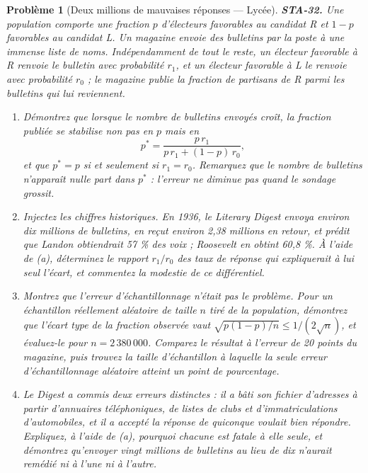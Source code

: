 \documentclass[11pt]{article}
\newtheorem{problem}{Problème}
\begin{document}
\bigskip

\begin{problem}[{Deux millions de mauvaises réponses --- Lycée}]
\textbf{STA-32.} Une population comporte une fraction $ p $ d'électeurs favorables au candidat
R et $ 1 - p $ favorables au candidat L. Un magazine envoie des bulletins par la poste à une
immense liste de noms. Indépendamment de tout le reste, un électeur favorable à R renvoie le
bulletin avec probabilité $ r_1 $, et un électeur favorable à L le renvoie avec probabilité
$ r_0 $ ; le magazine publie la fraction de partisans de R parmi les bulletins qui lui
reviennent.
\begin{enumerate}
\item[(a)] Démontrez que lorsque le nombre de bulletins envoyés croît, la fraction publiée se stabilise
non pas en $ p $ mais en
\[ p^{*} = \frac{p\, r_1}{p\, r_1 + (1-p)\, r_0} , \]
et que $ p^{*} = p $ si et seulement si $ r_1 = r_0 $. Remarquez que le nombre de bulletins
n'apparaît nulle part dans $ p^{*} $ : l'erreur ne diminue pas quand le sondage grossit.
\item[(b)] Injectez les chiffres historiques. En 1936, le \textit{Literary Digest} envoya environ dix
millions de bulletins, en reçut environ 2,38 millions en retour, et prédit que Landon obtiendrait
57 \% des voix ; Roosevelt en obtint 60,8 \%. À l'aide de (a), déterminez le rapport
$ r_1/r_0 $ des taux de réponse qui expliquerait à lui seul l'écart, et commentez la modestie de
ce différentiel.
\item[(c)] Montrez que l'erreur d'échantillonnage n'était pas le problème. Pour un échantillon réellement
aléatoire de taille $ n $ tiré de la population, démontrez que l'écart type de la fraction
observée vaut $ \sqrt{p(1-p)/n} \le 1/(2\sqrt{n}) $, et évaluez-le pour
$ n = 2\,380\,000 $. Comparez le résultat à l'erreur de 20 points du magazine, puis trouvez la
taille d'échantillon à laquelle la seule erreur d'échantillonnage aléatoire atteint un point de
pourcentage.
\item[(d)] Le \textit{Digest} a commis deux erreurs distinctes : il a bâti son fichier d'adresses à partir
d'annuaires téléphoniques, de listes de clubs et d'immatriculations d'automobiles, et il a accepté
la réponse de quiconque voulait bien répondre. Expliquez, à l'aide de (a), pourquoi chacune est
fatale à elle seule, et démontrez qu'envoyer vingt millions de bulletins au lieu de dix n'aurait
remédié ni à l'une ni à l'autre.
\end{enumerate}

\end{problem}
\end{document}
